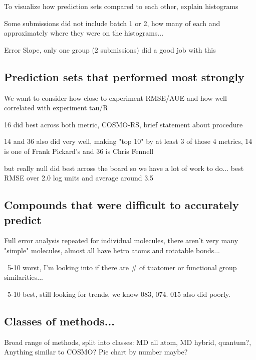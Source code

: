 To visualize how prediction sets compared to each other, explain histograms

Some submissions did not include batch 1 or 2, how many of each and approximately where they were on the histograms...

Error Slope, only one group (2 submissions) did a good job with this %


\subsection{Prediction sets that performed most strongly}
\label{results:2}
We want to consider how close to experiment RMSE/AUE and how well correlated with experiment tau/R

16 did best across both metric, COSMO-RS, brief statement about procedure

14 and 36 also did very well, making "top 10" by at least 3 of those 4 metrics, 14 is one of Frank Pickard's and 36 is Chris Fennell

but really null did best across the board so we have a lot of work to do... best RMSE over 2.0 log units and average around 3.5

\subsection{Compounds that were difficult to accurately predict}
\label{results:3}
Full error analysis repeated for individual molecules, there aren't very many "simple" molecules, almost all have hetro atoms and rotatable bonds...

~5-10 worst, I'm looking into if there are # of tuatomer or functional group similarities...

~5-10 best, still looking for trends, we know 083, 074. 015 also did poorly. 


\subsection{Classes of methods...}
\label{results:4}
Broad range of methods, split into classes: MD all atom, MD hybrid, quantum?, Anything similar to COSMO? %
Pie chart by number maybe?

